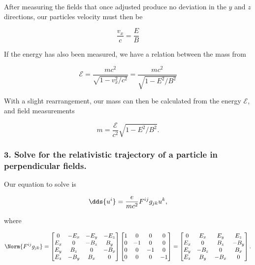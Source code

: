 After measuring the fields that once adjusted produce no deviation in the $y$ and $z$ directions, our particles velocity must then be

\begin{equation}\label{eqn:relElectroDynProblemSet2:430}
\frac{v_x}{c} = \frac{E}{B}
\end{equation}

If the energy has also been measured, we have a relation between the mass from

\begin{equation}\label{eqn:relElectroDynProblemSet2:450}
\mathcal{E} = \frac{m c^2}{\sqrt{1 - v_x^2/c^2}} = \frac{ m c^2 }{ \sqrt{ 1 - E^2/B^2 }}
\end{equation}

With a slight rearrangement, our mass can then be calculated from the energy $\mathcal{E}$, and field measurements

\begin{equation}\label{eqn:relElectroDynProblemSet2:470}
m = \frac{ \mathcal{E} }{c^2} \sqrt{ 1 - E^2/B^2 }.
\end{equation}

\subsubsection{3.  Solve for the relativistic trajectory of a particle in perpendicular fields.}

Our equation to solve is

\begin{equation}\label{eqn:relElectroDynProblemSet2:490}
\dds{u^i} = \frac{e}{m c^2} F^{ij} g_{jk} u^k,
\end{equation}

where

\begin{equation}\label{eqn:relElectroDynProblemSet2:510}
\Norm{ F^{ij} g_{jk} } = 
\begin{bmatrix}
0 & -E_x & -E_y & -E_z \\
E_x & 0 & -B_z & B_y \\
E_y & B_z & 0 & -B_x \\
E_z & -B_y & B_x & 0
\end{bmatrix}
\begin{bmatrix}
1 & 0 & 0 & 0 \\
0 & -1 & 0 & 0 \\
0 & 0 & -1 & 0 \\
0 & 0 & 0 & -1 \\
\end{bmatrix}
=
\begin{bmatrix}
0 & E_x & E_y & E_z \\
E_x & 0 & B_z & -B_y \\
E_y & -B_z & 0 & B_x \\
E_z & B_y & -B_x & 0
\end{bmatrix}.
\end{equation}

